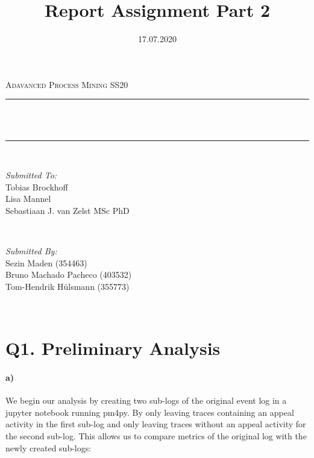 \documentclass[12pt]{report}
\title{Report Assignment Part 2}
\author{}
\date{17.07.2020}
\makeatletter
\let\thetitle\@title
\makeatother
\begin{document}

\begin{titlepage}
	\centering
    \vspace*{0.5 cm}
  \begin{center}    \textsc{\Large   Adavanced Process Mining SS20}\\[2.0 cm]	\end{center}
	\rule{\linewidth}{0.2 mm} \\[0.4 cm]
	{ \huge \bfseries \thetitle}\\
	\rule{\linewidth}{0.2 mm} \\[1.5 cm]
	
  \begin{minipage}{0.48\textwidth}
    \begin{flushleft} \large
      \emph{Submitted To:}\\
      Tobias Brockhoff\\
      Lisa Mannel\\
      Sebastiaan J. van Zelst MSc PhD\\
    \end{flushleft}
  \end{minipage}~
  \begin{minipage}{0.48\textwidth}
    \begin{flushright} \large
			\emph{Submitted By:} \\
      Sezin Maden (354463) \\
      Bruno Machado Pacheco (403532)  \\
      Tom-Hendrik Hülsmann (355773)
		\end{flushright}
	\end{minipage}\\[2 cm]
	
\end{titlepage}


\renewcommand{\thesection}{\arabic{section}}

\section{Q1. Preliminary Analysis}

\paragraph{\textbf{a)}}
We begin our analysis by creating two sub-logs of the original event log in a jupyter notebook running pm4py.
By only leaving traces containing an appeal activity in the first sub-log and only leaving traces without an appeal activity for the second sub-log.
This allows us to compare metrics of the original log with the newly created sub-logs:
\end{document}
